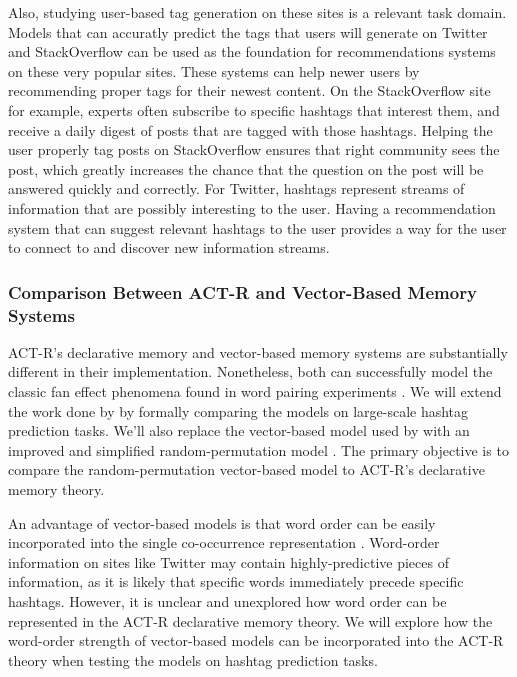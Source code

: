 \documentclass[man,floatsintext]{apa6}
\begin{document}
Also, studying user-based tag generation on these sites is a relevant task domain.
Models that can accuratly predict the tags that users will generate on Twitter and StackOverflow can be used as the foundation for recommendations systems on these very popular sites.
These systems can help newer users by recommending proper tags for their newest content.
On the StackOverflow site for example, experts often subscribe to specific hashtags that interest them, and receive a daily digest of posts that are tagged with those hashtags.
Helping the user properly tag posts on StackOverflow ensures that right community sees the post, which greatly increases the chance that the question on the post will be answered quickly and correctly.
For Twitter, hashtags represent streams of information that are possibly interesting to the user.
Having a recommendation system that can suggest relevant hashtags to the user provides a way for the user to connect to and discover new information streams.

\subsubsection{Comparison Between ACT-R and Vector-Based Memory Systems}

ACT-R's declarative memory and vector-based memory systems are substantially different in their implementation.
Nonetheless, both can successfully model the classic fan effect phenomena found in word pairing experiments \parencite{Rutledge2008}.
We will extend the work done by \textcite{Rutledge2008} by formally comparing the models on large-scale hashtag prediction tasks.
We'll also replace the vector-based model used by \textcite{Rutledge2008} with an improved and simplified random-permutation model \parencite{Sahlgren2008}.
The primary objective is to compare the random-permutation vector-based model to ACT-R's declarative memory theory.

An advantage of vector-based models is that word order can be easily incorporated into the single co-occurrence representation \parencite{Jones2007}.
Word-order information on sites like Twitter may contain highly-predictive pieces of information, as it is likely that specific words immediately precede specific hashtags.
However, it is unclear and unexplored how word order can be represented in the ACT-R declarative memory theory.
We will explore how the word-order strength of vector-based models can be incorporated into the ACT-R theory when testing the models on hashtag prediction tasks.
\end{document}
